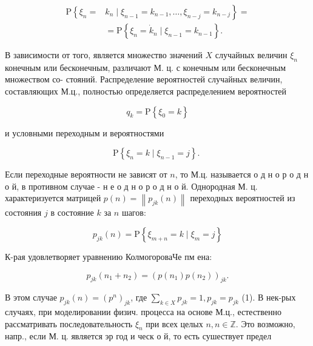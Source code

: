 \documentclass[10pt]{article}
\begin{document}
\[

\begin{aligned}

\mathrm{P}\left\{\xi_{n}=\right. & \left.k_{n} \mid \xi_{n-1}=k_{n-1}, \ldots, \xi_{n-j}=k_{n-j}\right\}= \\

& =\mathrm{P}\left\{\xi_{n}=\dot{k}_{n} \mid \xi_{n-1}=k_{n-1}\right\} .

\end{aligned}

\]



В зависимости от того, является множество значений $X$ случайных величин $\xi_{n}$ конечным или бесконечным, различают М. ц. с конечным или бесконечным множеством со- стояний. Распределение вероятностей случайных величин, составляющих М.ц., полностью определяется распределением вероятностей



\[

q_{k}=\mathrm{P}\left\{\xi_{0}=k\right\}

\]



и условными переходным и вероятностями



\[

\mathrm{P}\left\{\xi_{n}=k \mid \xi_{n-1}=j\right\} \text {. }

\]



Если переходные вероятности не зависят от $n$, то М.ц. называется о д н о р о д н о й, в противном случае - н е о д н о р о д н о й. Однородная М. ц. характеризуется матрицей $p(n)=\left\|p_{j k}(n)\right\|$ переходных вероятностей из состояния $j$ в состояние $k$ за $n$ шагов:



\[

p_{j k}(n)=\mathrm{P}\left\{\xi_{m+n}=k \mid \xi_{m}=j\right\}

\]



К-рая удовлетворяет уравнению КолмогороваЧе пм ена:



\[

p_{j k}\left(n_{1}+n_{2}\right)=\left(p\left(n_{1}\right) p\left(n_{2}\right)\right)_{j k} .

\]



В этом случае $p_{j k}(n)=\left(p^{n}\right)_{j k}$, где $\sum_{k \in X} p_{j k}=1, p_{j k}=p_{j k}$ (1). В нек-рых случаях, при моделировании физич. процесса на основе М.ц., естественно рассматривать последовательность $\xi_{n}$ при всех целых $n, n \in \mathbb{Z}$. Это возможно, напр., если М. ц. является эр год и ческ о й, то есть сушествует предел
\end{document}
